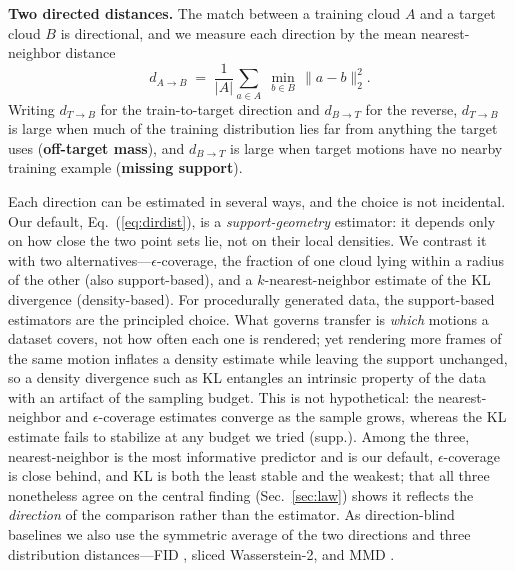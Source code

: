 \documentclass[runningheads]{llncs}
\newcommand{\dtb}{d_{T\to B}}
\newcommand{\dbt}{d_{B\to T}}
\begin{document}
\noindent\textbf{Two directed distances.}
The match between a training cloud $A$ and a target cloud $B$ is directional,
and we measure each direction by the mean nearest-neighbor distance
\begin{equation}
d_{A \to B} \;=\; \frac{1}{|A|}\sum_{a \in A}\; \min_{b \in B}\,
\lVert a - b \rVert_2^2 .
\label{eq:dirdist}
\end{equation}
Writing $\dtb$ for the train-to-target direction and $\dbt$ for the reverse,
$\dtb$ is large when much of the training distribution lies far from anything
the target uses (\textbf{off-target mass}), and $\dbt$ is large when target
motions have no nearby training example (\textbf{missing support}).

Each direction can be estimated in several ways, and the choice is not
incidental. Our default, Eq.~(\ref{eq:dirdist}), is a \emph{support-geometry}
estimator: it depends only on how close the two point sets lie, not on their
local densities. We contrast it with two alternatives---$\epsilon$-coverage,
the fraction of one cloud lying within a radius of the other (also
support-based), and a $k$-nearest-neighbor estimate of the KL divergence
(density-based). For procedurally generated data, the support-based estimators
are the principled choice. What governs transfer is \emph{which} motions a
dataset covers, not how often each one is rendered; yet rendering more frames
of the same motion inflates a density estimate while leaving the support
unchanged, so a density divergence such as KL entangles an intrinsic property
of the data with an artifact of the sampling budget. This is not hypothetical:
the nearest-neighbor and $\epsilon$-coverage estimates converge as the sample
grows, whereas the KL estimate fails to stabilize at any budget we tried
(supp.). Among the three, nearest-neighbor is the most informative predictor
and is our default, $\epsilon$-coverage is close behind, and KL is both the
least stable and the weakest; that all three nonetheless agree on the central
finding (Sec.~\ref{sec:law}) shows it reflects the \emph{direction} of the
comparison rather than the estimator. As direction-blind baselines we also use
the symmetric average of the two directions and three distribution
distances---FID \cite{heusel2018ganstrainedtimescaleupdate}, sliced
Wasserstein-2, and MMD \cite{gretton2008kernelmethodtwosampleproblem}.
\end{document}
